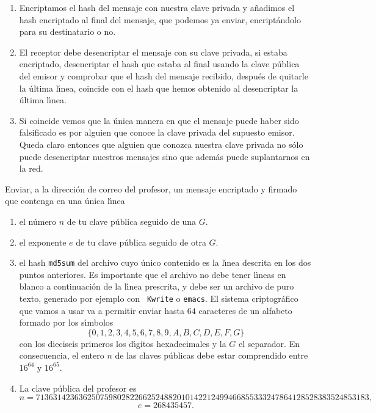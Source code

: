 \begin{enumerate}
\item Encriptamos el hash del mensaje {\sc con nuestra clave privada} y
a\~nadimos el hash encriptado al final del mensaje, que podemos ya enviar, 
encript\'andolo para su destinatario o no.
 
 \item El receptor debe desencriptar el mensaje con su clave privada, si estaba
encriptado,  desencriptar el hash que estaba al final usando la {\sc clave
p\'ublica del emisor} y comprobar que el hash del mensaje recibido, despu\'es de
quitarle la \'ultima l\'{\i}nea, coincide con el hash que hemos obtenido al
desencriptar la \'ultima l\'{\i}nea. 

\item Si coincide vemos que la \'unica manera en que el mensaje puede haber sido
falsificado es por alguien que conoce la clave privada del supuesto emisor.
Queda claro entonces que alguien que conozca nuestra clave privada no s\'olo
puede desencriptar nuestros mensajes sino que adem\'as puede suplantarnos en la
red. 
 \end{enumerate}

\bigskip


\begin{ejer}
Enviar, a la direcci\'on de correo del profesor, un mensaje
encriptado y firmado que contenga en una \'unica l\'{\i}nea 
\begin{enumerate}
 \item el n\'umero $n$ de tu clave p\'ublica seguido de una $G$.
 \item el exponente $e$ de tu clave p\'ublica seguido de otra $G$.
 \item el hash {\tt md5sum} del archivo cuyo \'unico contenido es 
la  l\'{\i}nea descrita en los dos puntos anteriores. Es importante que el
archivo no debe tener l\'{\i}neas en blanco a continuaci\'on de la l\'{\i}nea
prescrita, y debe ser un archivo de puro texto, generado por ejemplo con {\tt
Kwrite} o {\tt emacs}. 
El sistema criptogr\'afico que vamos a usar va a permitir enviar hasta $64$
caracteres de un alfabeto formado por los s\'{\i}mbolos 
\[\{0,1,2,3,4,5,6,7,8,9,A,B,C,D,E,F,G\}\]
\noindent con los dieciseis primeros los d\'{\i}gitos hexadecimales y la $G$ el
separador. En consecuencia, el entero $n$ de las claves p\'ublicas debe estar
comprendido entre $16^{64}$ y $16^{65}$. 
\item La clave p\'ublica del profesor es 
\[n=713631423636250759802822662524882010142212499466855333247864128528383524853183,\]
\[e=268435457. \] 
 \end{enumerate}
\end{ejer}


